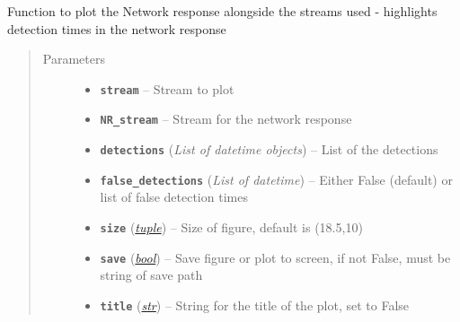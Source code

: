 \documentclass[a4paper,10pt,english]{sphinxmanual}
\begin{document}
\begin{fulllineitems}
\label{submodules/utils.EQcorrscan_plotting:EQcorrscan_plotting.NR_plot}
Function to plot the Network response alongside the streams used - highlights
detection times in the network response
\begin{quote}\begin{description}
\item[{Parameters}] \leavevmode\begin{itemize}
\item {} 
\textbf{\texttt{stream}} -- Stream to plot

\item {} 
\textbf{\texttt{NR\_stream}} -- Stream for the network response

\item {} 
\textbf{\texttt{detections}} (\emph{List of datetime objects}) -- List of the detections

\item {} 
\textbf{\texttt{false\_detections}} (\emph{List of datetime}) -- Either False (default) or list of false detection     times

\item {} 
\textbf{\texttt{size}} (\href{https://docs.python.org/library/functions.html\#tuple}{\emph{tuple}}) -- Size of figure, default is (18.5,10)

\item {} 
\textbf{\texttt{save}} (\href{https://docs.python.org/library/functions.html\#bool}{\emph{bool}}) -- Save figure or plot to screen, if not False, must be string of        save path

\item {} 
\textbf{\texttt{title}} (\href{https://docs.python.org/library/functions.html\#str}{\emph{str}}) -- String for the title of the plot, set to False

\end{itemize}

\end{description}\end{quote}

\end{fulllineitems}

\end{document}

